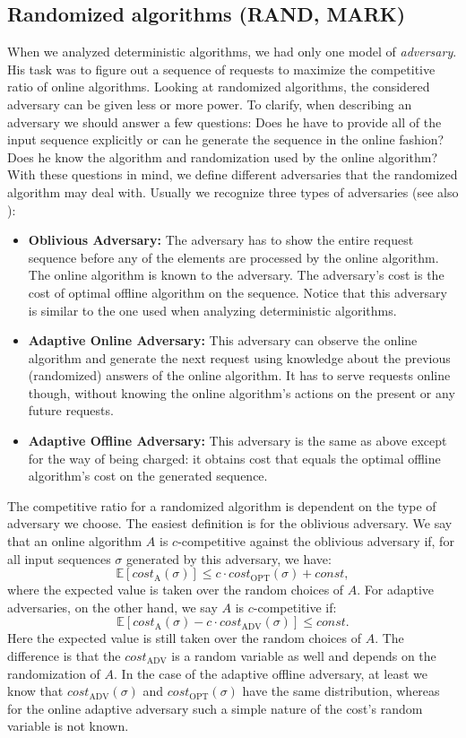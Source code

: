 \subsection{Randomized algorithms (RAND, MARK)}
When we analyzed deterministic algorithms, we had only one model of 
\textit{adversary}. His task was to figure out a sequence of requests to 
maximize the competitive ratio of online algorithms. Looking at randomized 
algorithms, the considered adversary can be given less or more power. To clarify,
when describing an adversary we should answer a few questions: Does he have to 
provide all of the input sequence explicitly or can he generate the sequence in the online fashion? 
Does he know the algorithm and randomization used by the online algorithm? With these questions 
in mind, we define different adversaries that the randomized algorithm may deal with.
Usually we recognize three types of adversaries
(see also \cite{bbktw}):
\begin{itemize}
\item \textbf{Oblivious Adversary:} The adversary has to show the entire request 
sequence before any of the elements are processed by the online algorithm. The online algorithm is known to 
the adversary. The adversary's cost is the cost of optimal offline algorithm on the 
sequence. Notice that this adversary is similar to the one used when analyzing
deterministic algorithms.
\item \textbf{Adaptive Online Adversary:} This adversary can observe the online 
algorithm and generate the next request using knowledge about the previous (randomized) 
answers of the online algorithm. It has to serve requests online though, without 
knowing the online algorithm's actions on the present or any future requests.
\item \textbf{Adaptive Offline Adversary:} This adversary is the same as above except for the 
way of being charged: it obtains cost that equals the optimal offline algorithm's cost
on the generated sequence.
\end{itemize}
The competitive ratio for a randomized algorithm is dependent on the type of 
adversary we choose. The easiest definition is for the oblivious adversary. We say 
that an online algorithm $A$ is $c$-competitive against the oblivious adversary if, for 
all input sequences $\sigma$ generated by this adversary, we have:
$$\mathbb{E}[cost_{\mathrm{A}}(\sigma)] \leq c\cdot cost_{\mathrm{OPT}}(\sigma) 
+ const,$$
where the expected value is taken over the random choices of $A$. For adaptive 
adversaries, on the other hand, we say $A$ is $c$-competitive if:
$$\mathbb{E}[cost_{\mathrm{A}}(\sigma) - c \cdot cost_{\mathrm{ADV}}(\sigma)]
\leq const.$$
Here the expected value is still taken over the random choices of $A$. The difference 
is that the $cost_{\mathrm{ADV}}$ is a random variable as well and depends on the randomization 
of $A$. 
In the case of the adaptive offline adversary, at least we know that 
$cost_{\mathrm{ADV}}(\sigma)$ and $cost_{\mathrm{OPT}}(\sigma)$ have the same 
distribution, whereas for the online 
adaptive adversary such a simple nature of the cost's random variable is not known.

